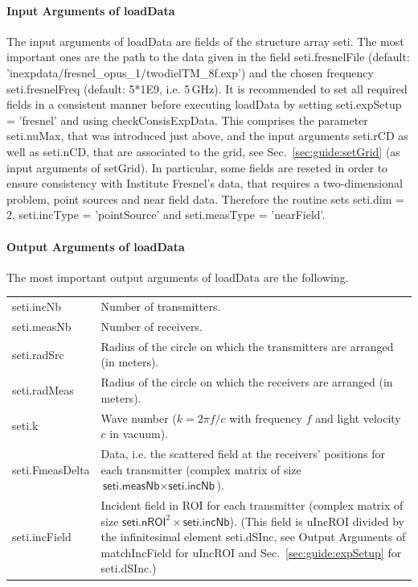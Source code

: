\documentclass[a4paper]{article}
\begin{document}
\paragraph{Input Arguments of \textsf{loadData}} The input arguments of \textsf{loadData} are fields of the structure array \textsf{seti}. The most important ones are the path to the data given in the field \textsf{seti.fresnelFile} (default: \textsf{'inexpdata/\allowbreak fresnel\_opus\_1/\allowbreak twodielTM\_8f.exp'}) and the chosen frequency \textsf{seti.fresnelFreq} (default: \textsf{5*1E9}, i.e. 5\,GHz). It is recommended to set all required fields in a consistent manner before executing \textsf{loadData} by setting \textsf{seti.expSetup = 'fresnel'} and using \textsf{checkConsisExpData}. This comprises the parameter \textsf{seti.nuMax}, that was introduced just above, and the input arguments \textsf{seti.rCD} as well as \textsf{seti.nCD}, that are associated to the grid, see Sec.~\ref{sec:guide:setGrid} (as input arguments of \textsf{setGrid}). In particular, some fields are reseted in order to ensure consistency with Institute Fresnel's data, that requires a two-dimensional problem, point sources and near field data. Therefore the routine sets \textsf{seti.dim = 2}, \textsf{seti.incType =  'pointSource'} and \textsf{seti.measType = 'nearField'}.

\paragraph{Output Arguments of \textsf{loadData}} The most important output arguments of \textsf{loadData} are the following.

\noindent\begin{tabular}[t]{p{2.3cm} p{13.3cm}}
\textsf{seti.incNb}   & Number of transmitters.\\
\textsf{seti.measNb}  & Number of receivers.\\
\textsf{seti.radSrc}  & Radius of the circle on which the transmitters are arranged (in meters).\\
\textsf{seti.radMeas} & Radius of the circle on which the receivers are arranged (in meters).\\
\textsf{seti.k}       & Wave number ($k = 2 \pi f/c$ with frequency $f$ and light velocity $c$ in vacuum).\\
\textsf{seti.FmeasDelta} & Data, i.e. the scattered field at the receivers' positions for each transmitter (complex matrix of size $\textsf{seti.measNb} \times \textsf{seti.incNb}$).\\
\textsf{seti.incField} & Incident field in ROI for each transmitter
  (complex matrix of size $\textsf{seti.nROI}^2 \times \textsf{seti.incNb}$). 
  (This field is \textsf{uIncROI} divided by the infinitesimal element \textsf{seti.dSInc}, see Output Arguments of \textsf{matchIncField} for \textsf{uIncROI} and Sec.~\ref{sec:guide:expSetup} for \textsf{seti.dSInc}.)
\end{tabular}
\end{document}
